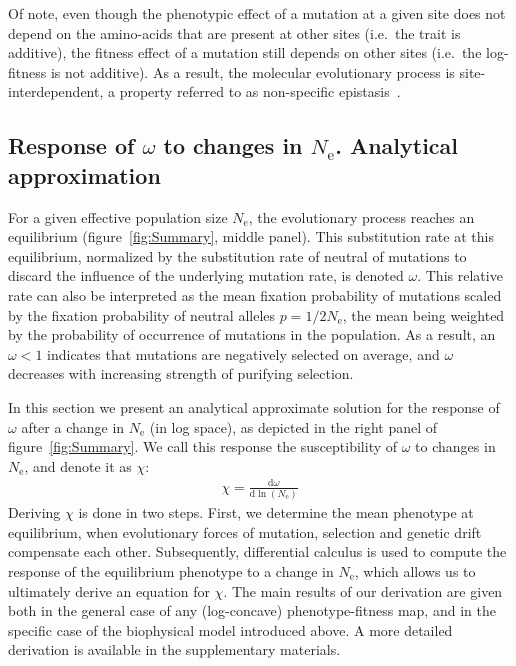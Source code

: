\documentclass[authoryear]{elsarticle} %
\newcommand{\der}{\mathrm{d}} %
\newcommand{\Ne}{N_{\text{e}}} %
\begin{document}
Of note, even though the phenotypic effect of a mutation at a given site does not depend on the amino-acids that are present at other sites (i.e.~the trait is additive), the fitness effect of a mutation still depends on other sites (i.e.~the log-fitness is not additive).
As a result, the molecular evolutionary process is site-interdependent, a property referred to as non-specific epistasis~\citep{Starr2016,Dasmeh2018}.

\subsection{Response of $\omega$ to changes in $\Ne$. Analytical approximation}

For a given {effective population size} $\Ne$, the evolutionary process reaches an equilibrium (figure~\ref{fig:Summary}, middle panel).
This {substitution} rate at this equilibrium, normalized by the {substitution} rate of {neutral} of mutations to discard the influence of the underlying mutation rate, is denoted $\omega$.
This relative rate can also be interpreted as the mean fixation probability of mutations scaled by the fixation probability of {neutral} {alleles} $p = 1 / {2 \Ne}$, the mean being weighted by the probability of occurrence of mutations in the population.
As a result, an $\omega < 1$ indicates that mutations are negatively selected on average, and $\omega$ decreases with increasing strength of purifying selection.

In this section we present an analytical approximate solution for the response of $\omega$ after a change in $\Ne$ (in log space), as depicted in the right panel of figure~\ref{fig:Summary}.
We call this response the susceptibility of $\omega$ to changes in $\Ne$, and denote it as $\chi$:
\begin{align}
    \chi = \frac{ \der \omega}{\der \ln (\Ne)} \label{eq:chi}
\end{align}
Deriving $\chi$ is done in two steps.
First, we determine the mean {phenotype} at equilibrium, when evolutionary forces of mutation, selection and {genetic drift} compensate each other.
Subsequently, differential calculus is used to compute the response of the equilibrium {phenotype} to a change in $\Ne$, which allows us to ultimately derive an equation for $\chi$.
The main results of our derivation are given both in the general case of any (log-concave) phenotype-fitness map, and in the specific case of the biophysical model introduced above.
A more detailed derivation is available in the supplementary materials.
\end{document}
